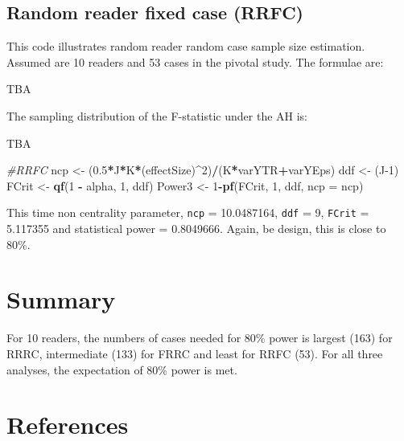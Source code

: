 \documentclass[
]{book}
\newenvironment{Shaded}{\begin{snugshade}}{\end{snugshade}}
\newcommand{\CommentTok}[1]{\textcolor[rgb]{0.56,0.35,0.01}{\textit{#1}}}
\newcommand{\DataTypeTok}[1]{\textcolor[rgb]{0.13,0.29,0.53}{#1}}
\newcommand{\DecValTok}[1]{\textcolor[rgb]{0.00,0.00,0.81}{#1}}
\newcommand{\FloatTok}[1]{\textcolor[rgb]{0.00,0.00,0.81}{#1}}
\newcommand{\KeywordTok}[1]{\textcolor[rgb]{0.13,0.29,0.53}{\textbf{#1}}}
\newcommand{\NormalTok}[1]{#1}
\newcommand{\OperatorTok}[1]{\textcolor[rgb]{0.81,0.36,0.00}{\textbf{#1}}}
\newcommand{\StringTok}[1]{\textcolor[rgb]{0.31,0.60,0.02}{#1}}
\begin{document}
\hypertarget{random-reader-fixed-case-rrfc}{%
\subsection{Random reader fixed case (RRFC)}\label{random-reader-fixed-case-rrfc}}

This code illustrates random reader random case sample size estimation. Assumed are 10 readers and 53 cases in the pivotal study. The formulae are:

TBA

The sampling distribution of the F-statistic under the AH is:

TBA

\begin{Shaded}
\begin{Highlighting}[]
\CommentTok{\#RRFC}
\NormalTok{ncp \textless{}{-}}\StringTok{ }\NormalTok{(}\FloatTok{0.5}\OperatorTok{*}\NormalTok{J}\OperatorTok{*}\NormalTok{K}\OperatorTok{*}\NormalTok{(effectSize)}\OperatorTok{\^{}}\DecValTok{2}\NormalTok{)}\OperatorTok{/}\NormalTok{(K}\OperatorTok{*}\NormalTok{varYTR}\OperatorTok{+}\NormalTok{varYEps)}
\NormalTok{ddf \textless{}{-}}\StringTok{ }\NormalTok{(J}\DecValTok{{-}1}\NormalTok{)}
\NormalTok{FCrit \textless{}{-}}\StringTok{ }\KeywordTok{qf}\NormalTok{(}\DecValTok{1} \OperatorTok{{-}}\StringTok{ }\NormalTok{alpha, }\DecValTok{1}\NormalTok{, ddf)}
\NormalTok{Power3 \textless{}{-}}\StringTok{ }\DecValTok{1}\OperatorTok{{-}}\KeywordTok{pf}\NormalTok{(FCrit, }\DecValTok{1}\NormalTok{, ddf, }\DataTypeTok{ncp =}\NormalTok{ ncp)}
\end{Highlighting}
\end{Shaded}

This time non centrality parameter, \texttt{ncp} = 10.0487164, \texttt{ddf} = 9, \texttt{FCrit} = 5.117355 and statistical power = 0.8049666. Again, be design, this is close to 80\%.

\hypertarget{summary-2}{%
\section{Summary}\label{summary-2}}

For 10 readers, the numbers of cases needed for 80\% power is largest (163) for RRRC, intermediate (133) for FRRC and least for RRFC (53). For all three analyses, the expectation of 80\% power is met.

\hypertarget{references-3}{%
\section{References}\label{references-3}}
\end{document}
